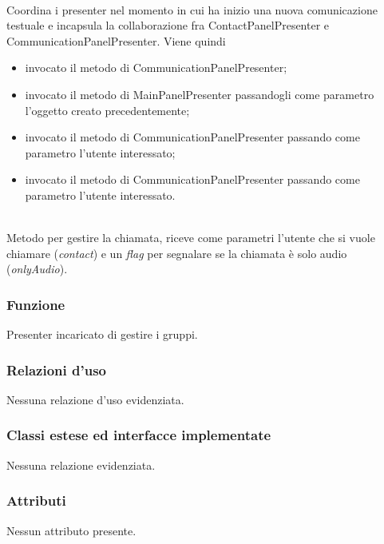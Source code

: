 \begin{description}
\item{}\\
Coordina i presenter nel momento in cui ha inizio una nuova comunicazione testuale e incapsula la collaborazione fra ContactPanelPresenter e CommunicationPanelPresenter. Viene quindi
\begin{itemize}
\item invocato il metodo  di CommunicationPanelPresenter;
\item invocato il metodo  di MainPanelPresenter passandogli come parametro l'oggetto creato precedentemente;
\item invocato il metodo  di CommunicationPanelPresenter passando come parametro l'utente interessato;
\item invocato il metodo  di CommunicationPanelPresenter passando come parametro l'utente interessato.
\end{itemize} 

\item{}\\
Metodo per gestire la chiamata, riceve come parametri l'utente che si vuole chiamare (\textit{contact}) e un \textit{flag} per segnalare se la chiamata è solo audio (\textit{onlyAudio}).

\end{description}


\subsubsection*{Funzione}
Presenter incaricato di gestire i gruppi.

\subsubsection*{Relazioni d'uso}
Nessuna relazione d'uso evidenziata.

\subsubsection*{Classi estese ed interfacce implementate}
Nessuna relazione evidenziata.

\subsubsection*{Attributi}
\begin{description}
\item Nessun attributo presente.
\end{description}

